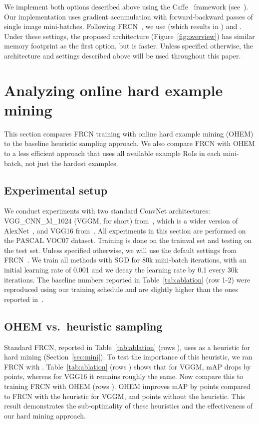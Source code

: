 \documentclass[10pt,twocolumn,letterpaper]{article}
\begin{document}
We implement both options described above using the Caffe~\cite{caffe} framework (see~\cite{frcn}). Our implementation uses gradient accumulation with  forward-backward passes of single image mini-batches. Following FRCN~\cite{frcn}, we use  (which results in ) and . Under these settings, the proposed architecture (Figure~\ref{fig:overview}) has similar memory footprint as the first option, but is  faster. Unless specified otherwise, the architecture and settings described above will be used throughout this paper.





\vspace{-0.05in}
\section{\label{sec:analyze}Analyzing online hard example mining}
\vspace{-0.03in}
This section compares FRCN training with online hard example mining (OHEM) to the baseline heuristic sampling approach. We also compare FRCN with OHEM to a less efficient approach that uses all available example RoIs in each mini-batch, not just the  hardest examples.

\vspace{-0.01in}
\subsection{Experimental setup}\label{sec:expsetup}
\vspace{-0.03in}
We conduct experiments with two standard ConvNet architectures: VGG\_CNN\_M\_1024 (VGGM, for short) from~\cite{Chatfield14}, which is a wider version of AlexNet~\cite{AlexNet}, and VGG16 from~\cite{VGG}. All experiments in this section are performed on the PASCAL VOC07 dataset. Training is done on the trainval set and testing on the test set. Unless specified otherwise, we will use the default settings from FRCN~\cite{frcn}. We train all methods with SGD for 80k mini-batch iterations, with an initial learning rate of 0.001 and we decay the learning rate by 0.1 every 30k iterations. The baseline numbers reported in Table~\ref{tab:ablation} (row 1-2) were reproduced using our training schedule and are slightly higher than the ones reported in~\cite{frcn}.

\subsection{OHEM vs.\ heuristic sampling}\label{sec:bglo}
\vspace{-0.03in}
Standard FRCN, reported in Table~\ref{tab:ablation} (rows ), uses  as a heuristic for hard mining (Section~\ref{sec:mini}). To test the importance of this heuristic, we ran FRCN with . Table~\ref{tab:ablation} (rows ) shows that for VGGM, mAP drops by  points, whereas for VGG16 it remains roughly the same. Now compare this to training FRCN with OHEM (rows ). OHEM improves mAP by  points compared to FRCN with the  heuristic for VGGM, and  points without the heuristic. This result demonstrates the sub-optimality of these heuristics and the effectiveness of our hard mining approach.
\end{document}
